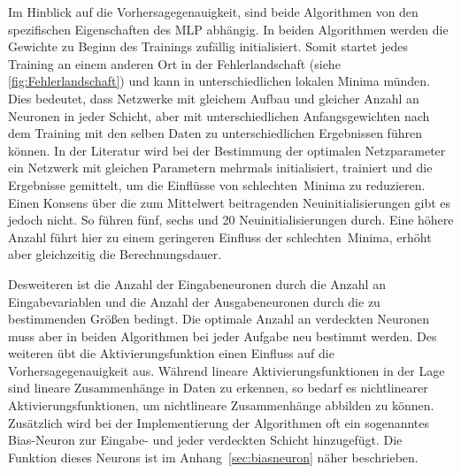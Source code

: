 Im Hinblick auf die Vorhersagegenauigkeit, sind beide Algorithmen von den spezifischen \hbox{Eigenschaften} des MLP abhängig. In beiden Algorithmen werden die Gewichte zu Beginn des Trainings zufällig initialisiert. Somit startet jedes Training an einem anderen Ort in der Fehlerlandschaft (siehe \autoref{fig:Fehlerlandschaft}) und kann in unterschiedlichen lokalen Minima münden. Dies bedeutet, dass Netzwerke mit gleichem Aufbau und gleicher Anzahl an Neuronen in jeder Schicht, aber mit unterschiedlichen Anfangsgewichten nach dem Training mit den selben Daten zu unterschiedlichen Ergebnissen führen können. In der Literatur wird bei der Bestimmung der optimalen Netzparameter ein Netzwerk mit gleichen Parametern mehrmals initialisiert, trainiert und die Ergebnisse gemittelt, um die Einflüsse von \glqq schlechten\grqq~Minima zu reduzieren. Einen Konsens über die zum Mittelwert beitragenden Neuinitialisierungen gibt es jedoch nicht. So führen \citet{Domanski2017} fünf, \citet{Keles2016} sechs und \citet{Monteiro2016} 20 Neuinitialisierungen durch. Eine höhere Anzahl führt hier zu einem geringeren Einfluss der \glqq schlechten\grqq~Minima, erhöht aber gleichzeitig die Berechnungsdauer.

Desweiteren ist die Anzahl der Eingabeneuronen durch die Anzahl an Eingabevariablen und die Anzahl der Ausgabeneuronen durch die zu bestimmenden Größen bedingt. Die optimale Anzahl an verdeckten Neuronen muss aber in beiden Algorithmen bei jeder Aufgabe neu bestimmt werden. Des weiteren übt die Aktivierungsfunktion einen Einfluss auf die Vorhersagegenauigkeit aus. Während lineare Aktivierungsfunktionen in der Lage sind lineare Zusammenhänge in Daten zu erkennen, so bedarf es nichtlinearer Aktivierungsfunktionen, um nichtlineare Zusammenhänge abbilden zu können.\, Zusätzlich wird bei der Implementierung der Algorithmen oft ein sogenanntes Bias-Neuron zur Eingabe- und jeder verdeckten Schicht hinzugefügt. Die Funktion dieses Neurons ist im Anhang~\ref{sec:biasneuron} näher beschrieben.